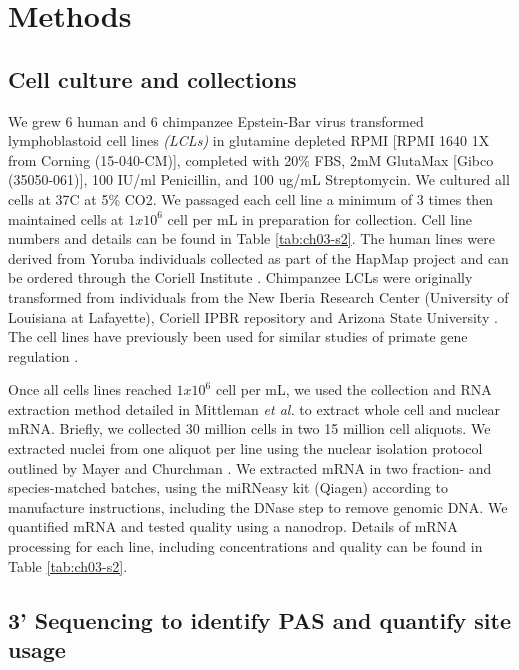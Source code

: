 \section{Methods}


\subsection{Cell culture and collections}\label{CellCultureColl}

We grew 6 human and 6 chimpanzee Epstein-Bar virus transformed lymphoblastoid cell lines \emph{(LCLs)} in glutamine depleted RPMI [RPMI 1640 1X from Corning (15-040-CM)], completed with 20\% FBS, 2mM GlutaMax [Gibco (35050-061)], 100 IU/ml Penicillin, and 100 ug/mL Streptomycin. We cultured all cells at 37C at 5\% CO2. We passaged each cell line a minimum of 3 times then maintained cells at $1x10^{6}$ cell per mL in preparation for collection. Cell line numbers and details can be found in Table \ref{tab:ch03-s2}. The human lines were derived from Yoruba individuals collected as part of the HapMap project and can be ordered through the Coriell Institute \citep{HapMap2005}. Chimpanzee LCLs were originally transformed from individuals from the New Iberia Research Center (University of Louisiana at Lafayette), Coriell IPBR repository and Arizona State University \citep{khan_primate_2013}. The cell lines have previously been used for similar studies of primate gene regulation \citep{cain_gene_2011, khan_primate_2013, wang_post-translational_2018, zhou_epigenetic_2014}.

Once all cells lines reached $1x10^{6}$ cell per mL, we used the collection and RNA extraction method detailed in Mittleman \emph{et al.} to extract whole cell and nuclear mRNA. Briefly, we collected 30 million cells in two 15 million cell aliquots. We extracted nuclei from one aliquot per line using the nuclear isolation protocol outlined by Mayer and Churchman \citep{mayer_genome-wide_2016}. We extracted mRNA in two fraction- and species-matched batches, using the miRNeasy kit (Qiagen) according to manufacture instructions, including the DNase step to remove genomic DNA. We quantified mRNA and tested quality using a nanodrop. Details of mRNA processing for each line, including concentrations and quality can be found in Table \ref{tab:ch03-s2}. 

\subsection{3' Sequencing to identify PAS and quantify site usage }\label{PASident}

